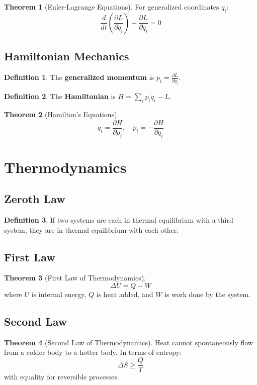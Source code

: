 \documentclass[11pt]{article}
\theoremstyle{definition}
\newtheorem{definition}{Definition}[section]
\newtheorem{theorem}{Theorem}[section]
\begin{document}
\begin{theorem}[Euler-Lagrange Equations]
For generalized coordinates $q_i$:
$$\frac{d}{dt}\left(\frac{\partial L}{\partial \dot{q}_i}\right) - \frac{\partial L}{\partial q_i} = 0$$
\end{theorem}

\subsection{Hamiltonian Mechanics}
\begin{definition}
The \textbf{generalized momentum} is $p_i = \frac{\partial L}{\partial \dot{q}_i}$.
\end{definition}

\begin{definition}
The \textbf{Hamiltonian} is $H = \sum_i p_i \dot{q}_i - L$.
\end{definition}

\begin{theorem}[Hamilton's Equations]
$$\dot{q}_i = \frac{\partial H}{\partial p_i}, \quad \dot{p}_i = -\frac{\partial H}{\partial q_i}$$
\end{theorem}

\section{Thermodynamics}

\subsection{Zeroth Law}
\begin{definition}
If two systems are each in thermal equilibrium with a third system, they are in thermal equilibrium with each other.
\end{definition}

\subsection{First Law}
\begin{theorem}[First Law of Thermodynamics]
$$\Delta U = Q - W$$
where $U$ is internal energy, $Q$ is heat added, and $W$ is work done by the system.
\end{theorem}

\subsection{Second Law}
\begin{theorem}[Second Law of Thermodynamics]
Heat cannot spontaneously flow from a colder body to a hotter body. In terms of entropy:
$$\Delta S \geq \frac{Q}{T}$$
with equality for reversible processes.
\end{theorem}
\end{document}
